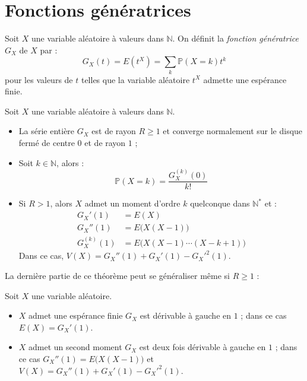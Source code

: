 \documentclass[11pt,a4paper,fleqn,pdftex]{report}
\begin{document}
\section{Fonctions génératrices} %
\label{sec:fonctions_generatrices}
\begin{dfn} %
     Soit $X$ une variable aléatoire à valeurs dans $\mathbb{N}$. On définit la \emph{fonction génératrice} $G_X$ de $X$ par : 
     \begin{equation}
     G_X (t) = E(t^X) = \sum_k \mathbb{P} (X=k) t^k
     \end{equation}
     pour les valeurs de $t$ telles que la variable aléatoire $t^X$ admette une espérance finie.
\end{dfn}
\begin{theorem}
     Soit $X$ une variable aléatoire à valeurs dans $\mathbb{N}$.
     \begin{itemize}[leftmargin=5.5mm]
         \item La série entière $G_X$ est de rayon $R \ge 1$ et converge normalement sur le disque fermé de centre 0 et de rayon $1$ ; 
         \item Soit $k\in \mathbb{N}$, alors : 
         \begin{equation}
         \mathbb{P}(X=k) = \dfrac{G_X^{(k)}(0)}{k!}
         \end{equation}
         \item Si $R > 1$, alors $X$ admet un moment d'ordre $k$ quelconque dans $\mathbb{N}^*$ et :
         \begin{subequations}
         \begin{align}
         G_X'(1) &= E(X) \\ G_X''(1) &= E\big( X(X-1)\big) \\ G_X^{(k)}(1) &= E\Big( X(X-1)\cdots (X-k+1)\Big)
         \end{align}
         \end{subequations}
         Dans ce cas, $V(X) = G_X''(1) + G_X'(1) - G_X'^2(1)$.
     \end{itemize}
\end{theorem}
La dernière partie de ce théorème peut se généraliser même si $R\ge 1$ :
\begin{itheorem}
     Soit $X$ une variable aléatoire.
     \begin{itemize}[leftmargin=5.5mm]
         \item $X$ admet une espérance finie \ssi{} $G_X$ est dérivable à gauche en $1$ ; dans ce cas $E(X) = G_X'(1)$.
         \item $X$ admet un second moment \ssi{} $G_X$ est deux fois dérivable à gauche en $1$ ; dans ce cas $G_X''(1) = E\big( X(X-1) \big)$ et $V(X) = G_X''(1) + G_X'(1) - G_X'^2(1)$.
     \end{itemize}
\end{itheorem}
\end{document}
